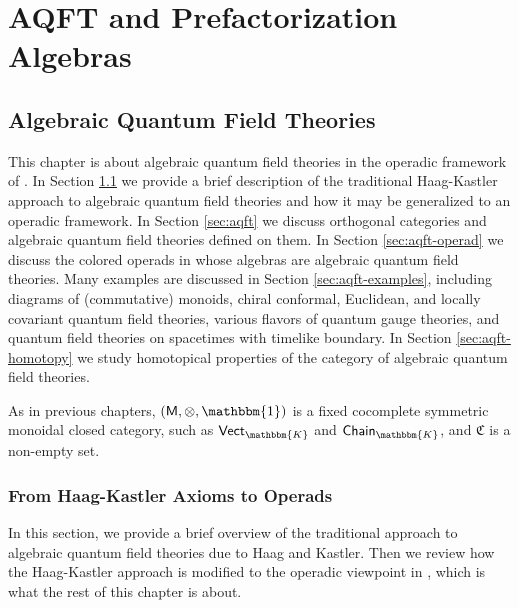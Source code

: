 \documentclass[11pt]{amsbook}
\numberwithin{section}{chapter}
\numberwithin{subsection}{section}
\numberwithin{equation}{section}
\theoremstyle{plain}
\theoremstyle{definition}
\newcommand{\fieldk}{\mathbbm{K}}
\newcommand{\colorc}{\mathfrak{C}}
\newcommand{\M}{\mathsf{M}}
\newcommand{\tensorunit}{\mathbbm{1}}
\newcommand{\Chaink}{\mathsf{Chain}_{\fieldk}}
\newcommand{\Vectk}{\mathsf{Vect}_{\fieldk}}
\begin{document}
\part{AQFT and Prefactorization Algebras}\label{part:aqft-pfa}

\chapter{Algebraic Quantum Field Theories}\label{ch:aqft}

This chapter is about algebraic quantum field theories in the operadic framework of \cite{bsw}.  In Section \ref{sec:haag-kastler} we provide a brief description of the traditional Haag-Kastler approach to algebraic quantum field theories and how it may be generalized to an operadic framework.  In Section \ref{sec:aqft} we discuss orthogonal categories and algebraic quantum field theories defined on them.  In Section \ref{sec:aqft-operad} we discuss the colored operads in \cite{bsw} whose algebras are algebraic quantum field theories.  Many examples are discussed in Section \ref{sec:aqft-examples}, including diagrams of (commutative) monoids, chiral conformal, Euclidean, and locally covariant quantum field theories, various flavors of quantum gauge theories, and quantum field theories on spacetimes with timelike boundary.  In Section \ref{sec:aqft-homotopy} we study homotopical properties of the category of algebraic quantum field theories.

As in previous chapters, $(\M,\otimes,\tensorunit)$ is a fixed cocomplete symmetric monoidal closed category, such as $\Vectk$ and $\Chaink$, and $\colorc$ is a non-empty set.


\section{From Haag-Kastler Axioms to Operads}\label{sec:haag-kastler}

In this section, we provide a brief overview of the traditional approach to algebraic quantum field theories due to Haag and Kastler.  Then we review how the Haag-Kastler approach is modified to the operadic viewpoint in \cite{bsw}, which is what the rest of this chapter is about.
\end{document}
